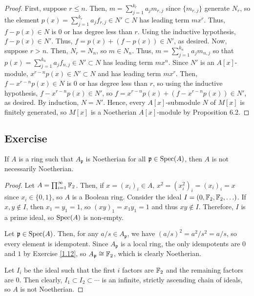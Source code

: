 \begin{proof}
First, suppose $r \le n$. Then, $m = \sum_{j=1}^{k_r} a_j m_{r,j}$ since $\{m_{r,j}\}$ generate $N_r$, so the element 
$p(x) = \sum_{j=1}^{k_r} a_j f_{r,j} \in N' \subset N$ has leading term $m x^r$. Thus, $f - p(x) \in N$ is $0$ or has degree less than $r$. Using the
inductive hypothesis, $f - p(x) \in N'$. Thus, $f = p(x) + (f - p(x)) \in N'$, as desired. Now, suppose $r > n$. Then, $N_r = N_n$, so $m \in N_n$.
Thus, $m = \sum_{j=1}^{k_n} a_j m_{n,j}$ so that $p(x) = \sum_{j=1}^{k_n} a_j f_{n,j} \in N' \subset N$ has leading term $m x^n$. Since $N'$ is an
$A[x]$-module, $x^{r - n}p(x) \in N' \subset N$ and has leading term $mx^r$. Then, $f - x^{r - n}p(x) \in N$ is $0$ or has degree less than $r$,
so using the inductive hypothesis, $f - x^{r - n}p(x) \in N'$, so $f = x^{r - n}p(x) + (f - x^{r - n}p(x)) \in N'$, as desired. By induction,
$N = N'$. Hence, every $A[x]$-submodule $N$ of $M[x]$ is finitely generated, so $M[x]$ is a Noetherian $A[x]$-module by Proposition 6.2.
\end{proof}

\subsection{Exercise}\label{7.11}

If $A$ is a ring such that $A_{\mathfrak{p}}$ is Noetherian for all $\mathfrak{p} \in \operatorname{Spec}(A)$, then $A$ is not necessarily Noetherian.

\begin{proof}
Let $A = \prod_{i=1}^{\infty} \mathbb{F}_2$. Then, if $x = (x_i)_i \in A$, $x^2 = (x_i^2)_i = (x_i)_i = x$ since $x_i \in \{0,1\}$, so $A$ is a Boolean ring.
Consider the ideal $I = (0,\mathbb{F}_2,\mathbb{F}_2,\ldots)$. If $x,y \not\in I$, then $x_1=y_1=1$, so $(xy)_1 = x_1y_1 = 1$ and thus $xy \not\in I$. Therefore, $I$ is a 
prime ideal, so $\operatorname{Spec}(A)$ is non-empty.

Let $\mathfrak{p} \in \operatorname{Spec}(A)$. Then, for any $a/s \in A_{\mathfrak{p}}$, we have $(a/s)^2 = a^2/s^2 = a/s$, so every element is idempotent. Since $A_{\mathfrak{p}}$
is a local ring, the only idempotents are $0$ and $1$ by Exercise \ref{1.12}, so $A_{\mathfrak{p}} \cong \mathbb{F}_2$, which is clearly Noetherian.

Let $I_i$ be the ideal such that the first $i$ factors are $\mathbb{F}_2$ and the remaining factors are $0$. Then clearly, $I_1 \subset I_2 \subset \cdots$ is
an infinite, strictly ascending chain of ideals, so $A$ is not Noetherian.
\end{proof}

